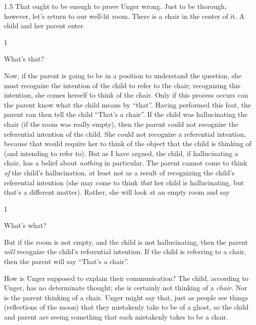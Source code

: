 \documentclass[11pt]{article}
\newcommand{\stage}[3]%
{%
	\begin{spacing}{1}%
	\vspace{0pt}
		\begin{description}[style=nextline, parsep=0pt, leftmargin=15mm, itemindent=-10mm, font=\mdseries]
			\item[\textsc{#1} \emph{#2}] #3
		\end{description}%
	\end{spacing}%
}
\begin{document}
\begin{spacing}{1.5}
That ought to be enough to prove Unger wrong.  Just to be thorough, however, let's return to our well-lit room.  There is a chair in the center of it.  A child and her parent enter.

\stage{Child}{(pointing at the chair)}{What's that?}
Now, if the parent is going to be in a position to understand the question, she must recognize the intention of the child to refer to the chair; recognizing this intention, she comes herself to think of the chair.  Only if this process occurs can the parent know what the child means by ``that''.  Having performed this feat, the parent can then tell the child ``That's a chair''.  If the child was hallucinating the chair (if the room was really empty), then the parent could not recognize the referential intention of the child.  She could not recognize a referential intention, because that would require her to think of the object that the child is thinking of (and intending to refer to).  But as I have argued, the child, if hallucinating a chair, has a belief about {\em nothing} in particular.  The parent cannot come to think {\em of} the child's hallucination, at least not as a result of recognizing the child's referential intention (she may come to think {\em that} her child is hallucinating, but that's a different matter).  Rather, she will look at an empty room and say

\stage{Parent}{}{What's what?}

But if the room is not empty, and the child is not hallucinating, then the parent {\em will} recognize the child's referential intention.  If the child is referring to a chair, then the parent will say ``That's a chair''.

%
%

How is Unger supposed to explain their communication? The child, according to Unger, has no determinate thought; she is certainly not thinking of a {\em chair}.  Nor is the parent thinking of a chair.  Unger might say that, just as people see things (reflections of the moon) that they mistakenly take to be of a ghost, so the child and parent are seeing something that each mistakenly takes to be a chair.


\end{spacing}
\end{document}
